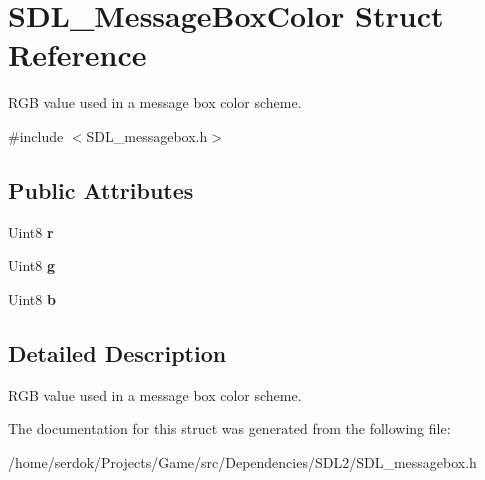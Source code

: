 \hypertarget{structSDL__MessageBoxColor}{}\section{S\+D\+L\+\_\+\+Message\+Box\+Color Struct Reference}
\label{structSDL__MessageBoxColor}


R\+GB value used in a message box color scheme.  




{\ttfamily \#include $<$S\+D\+L\+\_\+messagebox.\+h$>$}

\subsection*{Public Attributes}
\begin{DoxyCompactItemize}
\item 
\mbox{\label{structSDL__MessageBoxColor_a43ab2172c10058380fcf67ecc3f53184}} 
Uint8 {\bfseries r}
\item 
\mbox{\label{structSDL__MessageBoxColor_a5820adab0b32aa3eade101ea36ed6b4a}} 
Uint8 {\bfseries g}
\item 
\mbox{\label{structSDL__MessageBoxColor_ad1215a42167cb5b190ff8f19dbd42066}} 
Uint8 {\bfseries b}
\end{DoxyCompactItemize}


\subsection{Detailed Description}
R\+GB value used in a message box color scheme. 

The documentation for this struct was generated from the following file\+:\begin{DoxyCompactItemize}
\item 
/home/serdok/\+Projects/\+Game/src/\+Dependencies/\+S\+D\+L2/S\+D\+L\+\_\+messagebox.\+h\end{DoxyCompactItemize}
